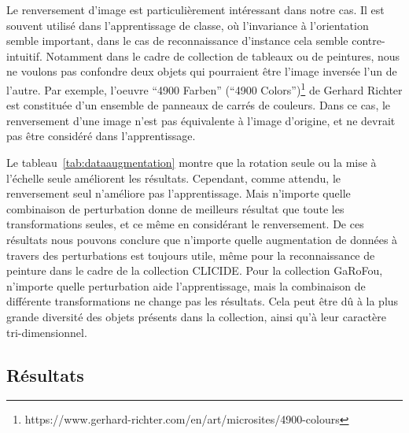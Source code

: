 Le renversement d'image est particulièrement intéressant dans notre cas. 
Il est souvent utilisé dans l'apprentissage de classe, où l'invariance à l'orientation semble important, dans le cas de reconnaissance d'instance cela semble contre-intuitif.
Notamment dans le cadre de collection de tableaux ou de peintures, nous ne voulons pas confondre deux objets qui pourraient être l'image inversée l'un de l'autre. 
Par exemple, l'oeuvre ``4900 Farben'' (``4900 Colors'')\footnote{https://www.gerhard-richter.com/en/art/microsites/4900-colours} de Gerhard Richter est constituée d'un ensemble de panneaux de carrés de couleurs.
Dans ce cas, le renversement d'une image n'est pas équivalente à l'image d'origine, et ne devrait pas être considéré dans l'apprentissage.

Le tableau~\ref{tab:dataaugmentation} montre que la rotation seule ou la mise à l'échelle seule améliorent les résultats. 
Cependant, comme attendu, le renversement seul n'améliore pas l'apprentissage.
Mais n'importe quelle combinaison de perturbation donne de meilleurs résultat que toute les transformations seules, et ce même en considérant le renversement.
De ces résultats nous pouvons conclure que n'importe quelle augmentation de données à travers des perturbations est toujours utile, même pour la reconnaissance de peinture dans le cadre de la collection CLICIDE.
Pour la collection GaRoFou, n'importe quelle perturbation aide l'apprentissage, mais la combinaison de différente transformations ne change pas les résultats.
Cela peut être dû à la plus grande diversité des objets présents dans la collection, ainsi qu'à leur caractère tri-dimensionnel.


\subsection{Résultats}
\label{sec:resultatsimilarite}

